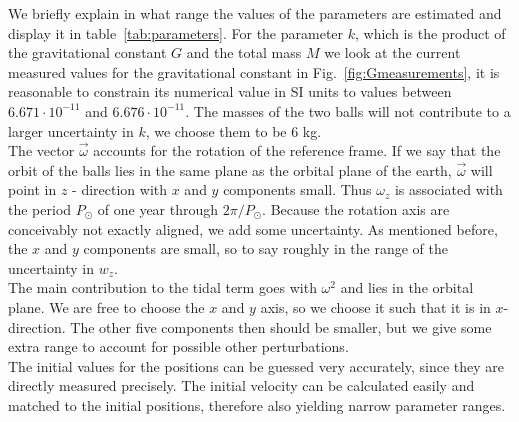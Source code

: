 \documentclass[prb,preprint]{revtex4-1}
\begin{document}
We briefly explain in what range the values of the parameters are estimated and display it in table~\ref{tab:parameters}.
For the parameter $k$, which is the product of the gravitational constant $G$ and the total mass $M$ we look at the current measured values for the gravitational constant in Fig.~\ref{fig:Gmeasurements}, it is reasonable to constrain its numerical value in SI units to values between $6.671 \cdot 10^{-11}$ and $6.676 \cdot 10^{-11}$. The masses of the two balls will not contribute to a larger uncertainty in $k$, we choose them to be 6 kg.\\
The vector $\vec{\omega}$ accounts for the rotation of the reference frame. If we say that the orbit of the balls lies in the same plane as the orbital plane of the earth, $\vec{\omega}$ will point in $z$ - direction with $x$ and $y$ components small. Thus $\omega_z$ is associated with the period $P_\odot$ of one year through $2\pi/P_\odot$. Because the rotation axis are conceivably not exactly aligned, we add some uncertainty. As mentioned before, the $x$ and $y$ components are small, so to say roughly in the range of the uncertainty in $w_z$.\\
The main contribution to the tidal term goes with $\omega^2$ and lies in the orbital plane. We are free to choose the $x$ and $y$ axis, so we choose it such that it is in $x$-direction. The other five components then should be smaller, but we give some extra range to account for possible other perturbations.\\
% 
%
The initial values for the positions can be guessed very accurately, since they are directly measured precisely. The initial velocity can be calculated easily and matched to the initial positions, therefore also yielding narrow parameter ranges.\\
\end{document}
